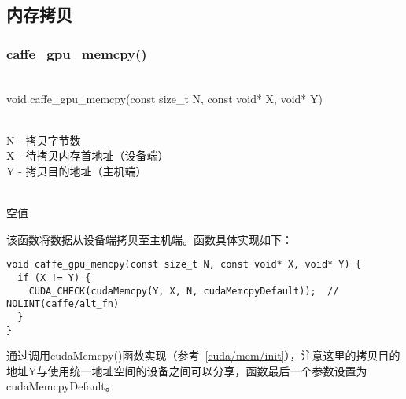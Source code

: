 \subsection{内存拷贝}\label{math/mem/cpy}
\subsubsection{caffe\_gpu\_memcpy()}
\begin{cnfrmfunc}
   \item{}\\
     void caffe\_gpu\_memcpy(const size\_t N, const void* X, void* Y)
   \item{}\\
     N - 拷贝字节数\\
     X - 待拷贝内存首地址（设备端）\\
     Y - 拷贝目的地址（主机端）
   \item{}\\
     空值
\end{cnfrmfunc}
该函数将数据从设备端拷贝至主机端。函数具体实现如下：
\begin{verbatim}
void caffe_gpu_memcpy(const size_t N, const void* X, void* Y) {
  if (X != Y) {
    CUDA_CHECK(cudaMemcpy(Y, X, N, cudaMemcpyDefault));  // NOLINT(caffe/alt_fn)
  }
}
\end{verbatim}
通过调用cudaMemcpy()函数实现（参考~\ref{cuda/mem/init}），注意这里的拷贝目的地址Y与使用统一地址空间的设备之间可以分享，函数最后一个参数设置为cudaMemcpyDefault。